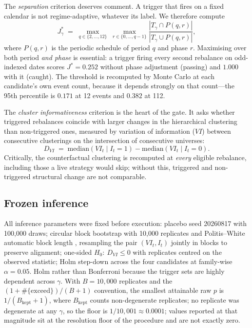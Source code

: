 \documentclass[12pt,letterpaper]{article}
\begin{document}
The \emph{separation} criterion deserves comment. A trigger that fires on a fixed
calendar is not regime-adaptive, whatever its label. We therefore compute
\begin{equation}
J^{*}_\gamma \;=\; \max_{q \in \{2,\dots,12\}} \; \max_{r \in \{0,\dots,q-1\}}
\frac{\left| T_\gamma \cap P(q,r) \right|}{\left| T_\gamma \cup P(q,r) \right|},
\label{eq:jstar}
\end{equation}
where $P(q,r)$ is the periodic schedule of period $q$ and phase $r$. Maximising over
both period \emph{and phase} is essential: a trigger firing every second rebalance on
odd-indexed dates scores $J^{*} = 0.252$ without phase adjustment (passing) and
$1.000$ with it (caught). The threshold is recomputed by Monte Carlo at each
candidate's own event count, because it depends strongly on that count---the 95th
percentile is $0.171$ at 12 events and $0.382$ at 112.

The \emph{cluster informativeness} criterion is the heart of the gate. It asks
whether triggered rebalances coincide with larger changes in the hierarchical
clustering than non-triggered ones, measured by variation of information ($VI$)
between consecutive clusterings on the intersection of consecutive universes:
\begin{equation}
D_{VI} \;=\; \mathrm{median}\!\left(VI_t \mid I_t = 1\right)
           - \mathrm{median}\!\left(VI_t \mid I_t = 0\right).
\label{eq:dvi}
\end{equation}
Critically, the counterfactual clustering is recomputed at \emph{every} eligible
rebalance, including those a live strategy would skip; without this, triggered and
non-triggered structural change are not comparable.

\subsection{Frozen inference}

All inference parameters were fixed before execution: placebo seed 20260817 with
100{,}000 draws; circular block bootstrap with 10{,}000 replicates and
Politis--White automatic block length \citep{politiswhite2004}, resampling the pair
$(VI_t, I_t)$ jointly in blocks to preserve alignment; one-sided
$H_0\!:\ D_{VI} \leq 0$ with replicates centred on the observed statistic; Holm
step-down across the four candidates at family-wise $\alpha = 0.05$. Holm rather than Bonferroni because the trigger sets are highly dependent across
$\gamma$. With $B = 10{,}000$ replicates and the $(1 + \#\{\text{exceed}\})/(B + 1)$
convention, the smallest attainable raw $p$ is $1/(B_{\text{kept}} + 1)$, where $B_{\text{kept}}$ counts non-degenerate replicates; no replicate was degenerate at any $\gamma$, so the floor is $1/10{,}001 \approx 0.0001$; values
reported at that magnitude sit at the resolution floor of the procedure and are not
exactly zero.
\end{document}
